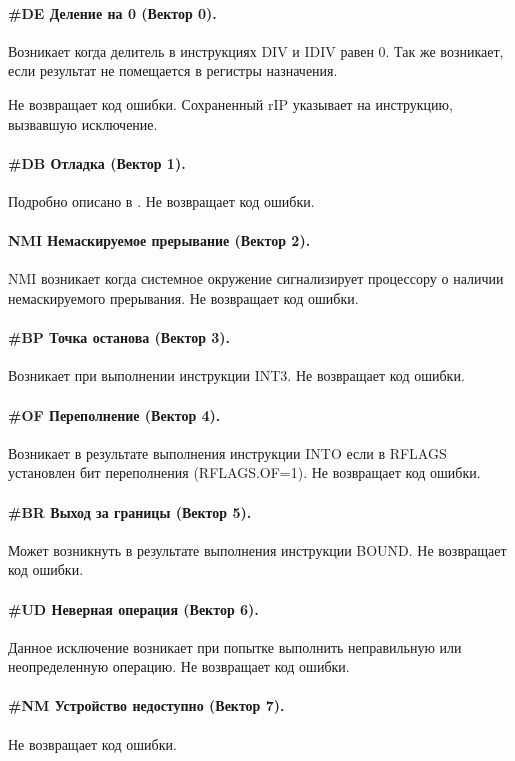 \paragraph{\#DE Деление на 0 (Вектор 0).}
Возникает когда делитель в инструкциях DIV и IDIV равен 0. Так же возникает,
если результат не помещается в регистры назначения.

Не возвращает код ошибки. Сохраненный rIP указывает на инструкцию, вызвавшую
исключение.

\paragraph{\#DB Отладка (Вектор 1).}
Подробно описано в \cite{amd_pm_v2}. Не возвращает код ошибки.

\paragraph{NMI Немаскируемое прерывание (Вектор 2).}
NMI возникает когда системное окружение сигнализирует процессору о наличии
немаскируемого прерывания. Не возвращает код ошибки.

\paragraph{\#BP Точка останова (Вектор 3).}
Возникает при выполнении инструкции INT3. Не возвращает код ошибки.

\paragraph{\#OF Переполнение (Вектор 4).}
Возникает в результате выполнения инструкции INTO если в RFLAGS установлен бит
переполнения (RFLAGS.OF=1). Не возвращает код ошибки.

\paragraph{\#BR Выход за границы (Вектор 5).}
Может возникнуть в результате выполнения инструкции BOUND. Не возвращает код ошибки.

\paragraph{\#UD Неверная операция (Вектор 6).}
Данное исключение возникает при попытке выполнить неправильную или
неопределенную операцию. Не возвращает код ошибки.

\paragraph{\#NM Устройство недоступно (Вектор 7).}
Не возвращает код ошибки.

